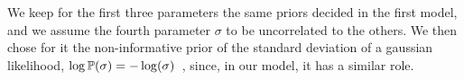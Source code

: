 We keep for the first three parameters the same priors decided in the first model, and we assume the fourth parameter $\sigma$ to be uncorrelated to the others. %
We then chose for it the non-informative prior of the standard deviation of a gaussian likelihood, $\log \mathbb{P} (\sigma) = - \log(\sigma)$~\cite{mackay2003}, since, in our model, it has a similar role.
